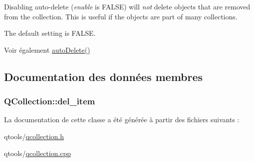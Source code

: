 Disabling auto-\/delete ({\itshape enable} is F\+A\+L\+S\+E) will {\itshape not} delete objects that are removed from the collection. This is useful if the objects are part of many collections.

The default setting is F\+A\+L\+S\+E.

\begin{DoxySeeAlso}{Voir également}
\hyperlink{class_q_collection_a27d2028ae84b3ecedec5ad687bf75544}{auto\+Delete()} 
\end{DoxySeeAlso}


\subsection{Documentation des données membres}
\hypertarget{class_q_collection_a4774837390e8009788fb1124fd051d96}{}
\subsubsection[{del\+\_\+item}]{ Q\+Collection\+::del\+\_\+item\hspace{0.3cm}{\ttfamily [protected]}}\label{class_q_collection_a4774837390e8009788fb1124fd051d96}


La documentation de cette classe a été générée à partir des fichiers suivants \+:\begin{DoxyCompactItemize}
\item 
qtools/\hyperlink{qcollection_8h}{qcollection.\+h}\item 
qtools/\hyperlink{qcollection_8cpp}{qcollection.\+cpp}\end{DoxyCompactItemize}
